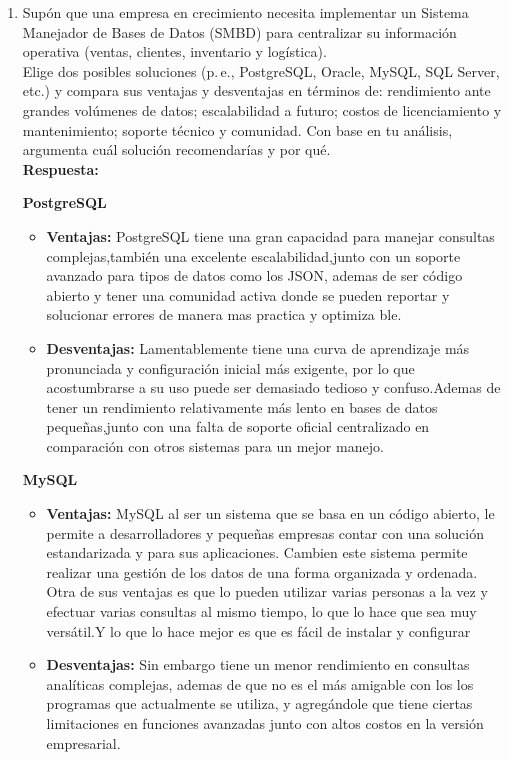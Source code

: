 \documentclass[12pt]{report}
\begin{document}
\begin{enumerate}[label=\textbf{\arabic*.}, leftmargin=*]
\begin{enumerate}[label=\textbf{\alph*.}, leftmargin=*, itemsep=1.0em]
\item Sup\'on que una empresa en crecimiento necesita implementar un Sistema Manejador de Bases de Datos (SMBD) para centralizar su informaci\'on operativa (ventas, clientes, inventario y log\'istica). \\
Elige dos posibles soluciones (p.\,e., PostgreSQL, Oracle, MySQL, SQL Server, etc.) y compara sus ventajas y desventajas en t\'erminos de: rendimiento ante grandes vol\'umenes de datos; escalabilidad a futuro; costos de licenciamiento y mantenimiento; soporte t\'ecnico y comunidad. Con base en tu an\'alisis, argumenta cu\'al soluci\'on recomendar\'ias y por qu\'e.\\

\textbf{Respuesta:}

\textbf{PostgreSQL}
\begin{itemize}
    \item \textbf{Ventajas:} PostgreSQL tiene una gran capacidad para manejar consultas complejas,también una excelente escalabilidad,junto con un soporte avanzado para tipos de datos como los JSON, ademas de ser código abierto y tener una comunidad activa donde se pueden reportar y solucionar errores de manera mas practica y optimiza ble.
    \item \textbf{Desventajas:} Lamentablemente tiene una curva de aprendizaje más pronunciada y configuración inicial más exigente,  por lo que acostumbrarse a su uso puede ser demasiado tedioso y confuso.Ademas de tener un rendimiento relativamente más lento en bases de datos pequeñas,junto con una  falta de soporte oficial centralizado en comparación con otros sistemas para un mejor manejo.
\end{itemize}
\newpage
\textbf{MySQL}
\begin{itemize}
    \item \textbf{Ventajas:} MySQL al ser un sistema que se basa en un código abierto, le permite a desarrolladores y pequeñas empresas contar con una solución estandarizada y para sus aplicaciones.
    Cambien este sistema permite realizar una gestión de los datos de una forma organizada y ordenada.
    Otra de sus ventajas es que lo pueden utilizar varias personas a la vez y efectuar varias consultas al mismo tiempo, lo que lo hace que sea muy versátil.Y lo que lo hace mejor es que es fácil de instalar y configurar
    \item \textbf{Desventajas:} Sin embargo tiene un menor rendimiento en consultas analíticas complejas, ademas de que no es el más amigable con los los programas que actualmente se utiliza, y agregándole que  tiene ciertas limitaciones en funciones avanzadas junto con altos costos en la versión empresarial.
\end{itemize}


\end{enumerate}
\end{enumerate}
\end{document}
